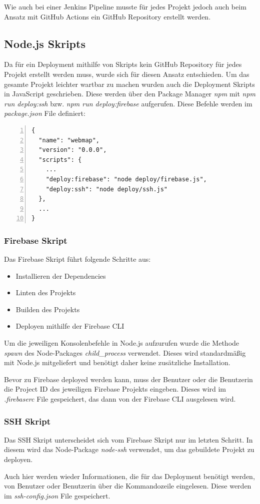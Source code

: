 Wie auch bei einer Jenkins Pipeline musste für jedes Projekt jedoch auch beim
Ansatz mit GitHub Actions ein GitHub Repository erstellt werden.

\subsection{Node.js Skripts}
Da für ein Deployment mithilfe von Skripts kein GitHub Repository für jedes Projekt erstellt werden muss,
wurde sich für diesen Ansatz entschieden.
Um das gesamte Projekt leichter wartbar zu machen wurden auch die Deployment Skripts in JavaScript geschrieben.
Diese werden über den Package Manager \textit{npm} mit \textit{npm run deploy:ssh} bzw.
\textit{npm run deploy:firebase} aufgerufen.
Diese Befehle werden im \textit{package.json} File definiert:

\begin{lstlisting}[numbers=left]
{
  "name": "webmap",
  "version": "0.0.0",
  "scripts": {
    ...
    "deploy:firebase": "node deploy/firebase.js",
    "deploy:ssh": "node deploy/ssh.js"
  },
  ...
}
\end{lstlisting}

\subsubsection{Firebase Skript}
Das Firebase Skript führt folgende Schritte aus:

\begin{itemize}
    \item Installieren der Dependencies
    \item Linten des Projekts
    \item Builden des Projekts
    \item Deployen mithilfe der Firebase CLI
\end{itemize}

Um die jeweiligen Konsolenbefehle in Node.js aufzurufen wurde die Methode \textit{spawn} des Node-Packages
\textit{child_process} verwendet.
Dieses wird standardmäßig mit Node.js mitgeliefert und benötigt daher keine zusätzliche Installation.

Bevor zu Firebase deployed werden kann, muss der Benutzer oder die Benutzerin die Project ID des jeweiligen
Firebase Projekts eingeben.
Dieses wird im \textit{.firebaserc} File gespeichert, das dann von der Firebase CLI ausgelesen wird.


\subsubsection{SSH Skript}
Das SSH Skript unterscheidet sich vom Firebase Skript nur im letzten Schritt.
In diesem wird das Node-Package \textit{node-ssh} verwendet, um das gebuildete Projekt zu deployen.

Auch hier werden wieder Informationen, die für das Deployment benötigt werden, von Benutzer oder Benutzerin über
die Kommandozeile eingelesen.
Diese werden im \textit{ssh-config.json} File gespeichert.
